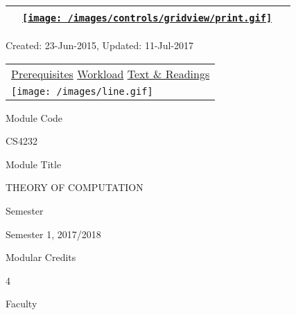 \hypertarget{ctl00_ctl00_ContentPlaceHolder1_ContentPlaceHolder1_UP}{}
\hypertarget{contentstart}{}
\hypertarget{ctl00_ctl00_ContentPlaceHolder1_ContentPlaceHolder1_pnlMain}{}
\begin{longtable}[]{@{}ll@{}}
\toprule
&
{\href{javascript:PrintThisPage();}{\texttt{[image: /images/controls/gridview/print.gif]}}~~}\tabularnewline
\bottomrule
\end{longtable}

\protect\hypertarget{ctl00_ctl00_ContentPlaceHolder1_ContentPlaceHolder1_LV_UpdateInfo_ctrl0_txtDate}{}{Created:
23-Jun-2015, Updated: 11-Jul-2017}

\begin{longtable}[]{@{}l@{}}
\toprule
\protect\hypertarget{ctl00_ctl00_ContentPlaceHolder1_ContentPlaceHolder1_lblSectionTop}{}{\protect\hyperlink{Prerequisites}{Prerequisites}
\textbar{} \protect\hyperlink{Workload}{Workload} \textbar{}
\protect\hyperlink{References}{Text \& Readings}}\tabularnewline
\texttt{[image: /images/line.gif]}\tabularnewline
\bottomrule
\end{longtable}

\hypertarget{ctl00_ctl00_ContentPlaceHolder1_ContentPlaceHolder1_LV_itemPlaceholderContainer}{}
\protect\hypertarget{ctl00_ctl00_ContentPlaceHolder1_ContentPlaceHolder1_LV_ctrl0_txtCode}{}{Module
Code}

\protect\hypertarget{ctl00_ctl00_ContentPlaceHolder1_ContentPlaceHolder1_LV_ctrl0_lcCode}{}{CS4232}

\protect\hypertarget{ctl00_ctl00_ContentPlaceHolder1_ContentPlaceHolder1_LV_ctrl0_lcCourse}{}{Module
Title}

\protect\hypertarget{ctl00_ctl00_ContentPlaceHolder1_ContentPlaceHolder1_LV_ctrl0_lcCourseName}{}{THEORY
OF COMPUTATION}

\protect\hypertarget{ctl00_ctl00_ContentPlaceHolder1_ContentPlaceHolder1_LV_ctrl0_lcSemester}{}{Semester}

\protect\hypertarget{ctl00_ctl00_ContentPlaceHolder1_ContentPlaceHolder1_LV_ctrl0_lcSem}{}{Semester
1, 2017/2018}

\protect\hypertarget{ctl00_ctl00_ContentPlaceHolder1_ContentPlaceHolder1_LV_ctrl0_lcModCredit}{}{Modular
Credits}

\protect\hypertarget{ctl00_ctl00_ContentPlaceHolder1_ContentPlaceHolder1_LV_ctrl0_lcModC}{}{4}

\protect\hypertarget{ctl00_ctl00_ContentPlaceHolder1_ContentPlaceHolder1_LV_ctrl0_lcFaculty}{}{Faculty}

